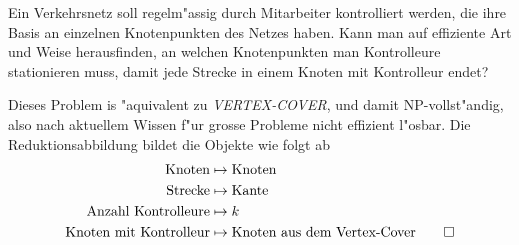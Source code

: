 Ein Verkehrsnetz soll regelm"assig durch Mitarbeiter
kontrolliert werden, die ihre Basis an einzelnen Knotenpunkten
des Netzes haben.
Kann man auf effiziente Art und Weise herausfinden, an welchen
Knotenpunkten man Kontrolleure stationieren muss, damit jede
Strecke in einem Knoten mit Kontrolleur endet?

\begin{loesung}
Dieses Problem is "aquivalent zu \textsl{VERTEX-COVER},
und damit NP-vollst"andig, also nach aktuellem Wissen f"ur
grosse Probleme nicht effizient l"osbar. Die Reduktionsabbildung
bildet die Objekte wie folgt ab
\begin{align*}
\text{Knoten}&\mapsto \text{Knoten}\\
\text{Strecke}&\mapsto \text{Kante}\\
\text{Anzahl Kontrolleure}&\mapsto k\\
\text{Knoten mit Kontrolleur}&\mapsto\text{Knoten aus dem Vertex-Cover}
\qedhere
\end{align*}
\end{loesung}
